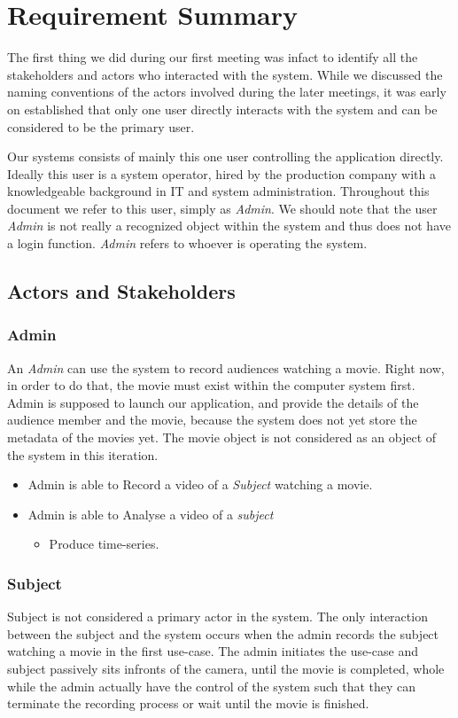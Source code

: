 \documentclass[12pt,a4paper,man]{report}
\begin{document}
\chapter{Requirement Summary}
\label{sec:org40a7ec3}
The first thing we did during our first meeting was infact to identify all the stakeholders and actors who interacted with the system. While we discussed the naming conventions of the actors involved during the later meetings, it was early on established that only one user directly interacts with the system and can be considered to be the primary user.

Our systems consists of mainly this one user controlling the application directly. Ideally this user is a system operator, hired by the production company with a knowledgeable background in IT and system administration. Throughout this document we refer to this user, simply as \emph{Admin}. We should note that the user \emph{Admin} is not really a recognized object within the system and thus does not have a login function. \emph{Admin} refers to whoever is operating the system.

\section{Actors and Stakeholders}
\label{sec:orgb405533}
\subsection{Admin}
\label{sec:orgfa89a7f}

An \emph{Admin} can use the system to record audiences watching a movie. Right now, in order to do that, the movie must exist within the computer system first. Admin is supposed to launch our application, and provide the details of the audience member and the movie, because the system does not yet store the metadata of the movies yet. The movie object is not considered as an object of the system in this iteration.

\begin{itemize}
\item Admin is able to Record a video of a \emph{Subject} watching a movie.
\item Admin is able to Analyse a video of a \emph{subject}
\begin{itemize}
\item Produce time-series.
\end{itemize}
\end{itemize}

\subsection{Subject}
\label{sec:orgb52c3a5}
Subject is not considered a primary actor in the system. The only interaction between the subject and the system occurs when the admin records the subject watching a movie in the first use-case. The admin initiates the use-case and subject passively sits infronts of the camera, until the movie is completed, whole while the admin actually have the control of the system such that they can terminate the recording process or wait until the movie is finished.
\end{document}
